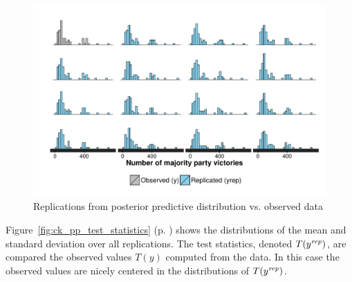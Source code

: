 \begin{figure}[h]
\centering
	\includegraphics[scale=0.7]{sections/figs/ck_pp_y_vs_yrep_new}
\caption{Replications from posterior predictive distribution vs. observed data}
\label{fig:ck_pp_hists}
\end{figure}


Figure~\ref{fig:ck_pp_test_statistics} (p. \pageref{fig:ck_pp_test_statistics}) shows the distributions 
of the mean and standard deviation over all replications. The test statistics, denoted $T(y^{\it rep})$, 
are compared the observed values $T(y)$ computed from the data. 
In this case the observed values are nicely centered in the distributions of $T(y^{\it rep})$. 

